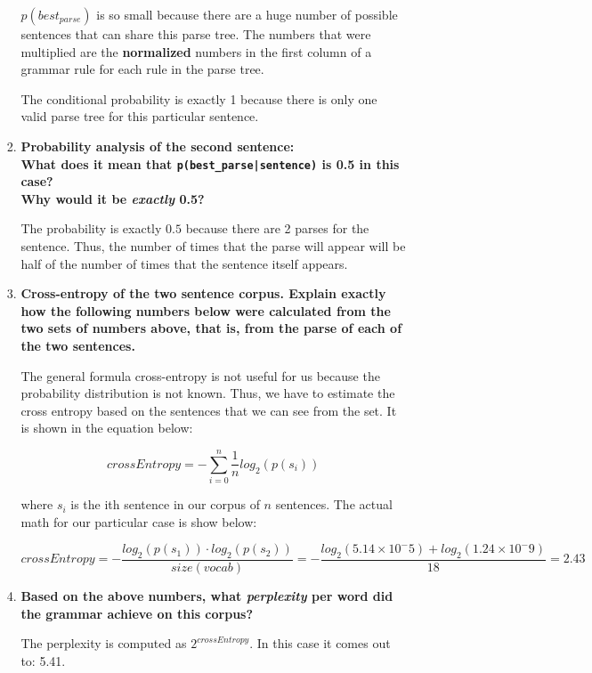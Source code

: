 \documentclass[10pt]{article}
\begin{document}
\begin{enumerate}
\begin{enumerate}
\begin{enumerate}
$p(best_{parse})$ is so small because there are a huge number of possible sentences that can share this parse tree. The numbers that were multiplied are the {\bf normalized} numbers in the first column of a grammar rule for each rule in the parse tree.

The conditional probability is exactly 1 because there is only one valid parse tree for this particular sentence.


\item {\bf Probability analysis of the second sentence:  \\
\noindent
What does it mean that \verb+p(best_parse|sentence)+ is 0.5 in this
case? \\
\noindent
Why would it be {\it exactly} 0.5?}


The probability is exactly $0.5$ because there are 2 parses for the sentence. Thus, the number of times that the parse will appear will be half of the number of times that the sentence itself appears.


\item {\bf Cross-entropy of the two sentence corpus. Explain exactly
    how the following numbers below were calculated from the two sets
    of numbers above, that is, from the parse of each of the two
    sentences.}

The general formula cross-entropy is not useful for us because the probability distribution is not known. Thus, we have to estimate the cross entropy based on the sentences that we can see from the set. It is shown in the equation below:

\begin{equation}
crossEntropy = - \sum_{i = 0}^{n} \frac{1}{n} log_2(p(s_i))
\end{equation}

where $s_i$ is the ith sentence in our corpus of $n$ sentences. The actual math for our particular case is show below:

\begin{equation}
crossEntropy = - \frac{log_2(p(s_1)) \cdot log_2(p(s_2))}{size(vocab)} = - \frac{log_2(5.14 \times10^-5) + log_2(1.24 \times 10^-9)}{18} = 2.43
\end{equation}


\item {\bf Based on the above numbers, what {\it perplexity} per word did
  the grammar achieve on this corpus?}
  
 The perplexity is computed as $2^{crossEntropy}$. In this case it comes out to: 5.41.


\end{enumerate}
\end{enumerate}
\end{enumerate}
\end{document}
